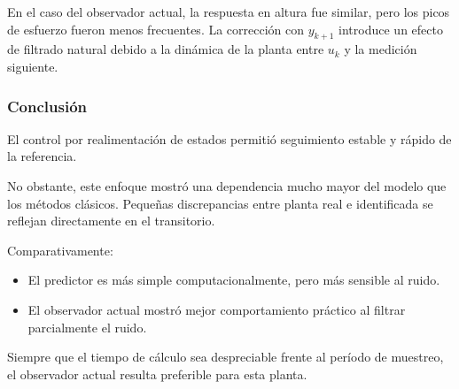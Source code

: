 En el caso del observador actual, la respuesta en altura fue similar,
pero los picos de esfuerzo fueron menos frecuentes. La corrección con
$y_{k+1}$ introduce un efecto de filtrado natural debido a la dinámica
de la planta entre $u_k$ y la medición siguiente.

\subsubsection{Conclusión}

El control por realimentación de estados permitió seguimiento estable
y rápido de la referencia.

No obstante, este enfoque mostró una dependencia mucho mayor del modelo
que los métodos clásicos. Pequeñas discrepancias entre planta real e
identificada se reflejan directamente en el transitorio.

Comparativamente:

\begin{itemize}
	\item El predictor es más simple computacionalmente, pero más sensible al ruido.
	\item El observador actual mostró mejor comportamiento práctico al filtrar parcialmente el ruido.
\end{itemize}

Siempre que el tiempo de cálculo sea despreciable frente al período
de muestreo, el observador actual resulta preferible para esta planta.


